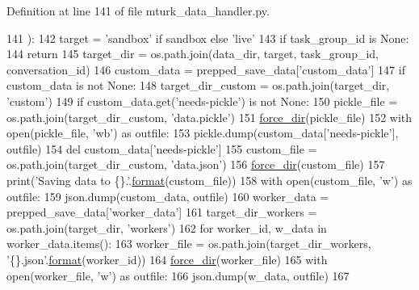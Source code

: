 Definition at line 141 of file mturk\+\_\+data\+\_\+handler.\+py.


\begin{DoxyCode}
141     ):
142         target = \textcolor{stringliteral}{'sandbox'} \textcolor{keywordflow}{if} sandbox \textcolor{keywordflow}{else} \textcolor{stringliteral}{'live'}
143         \textcolor{keywordflow}{if} task\_group\_id \textcolor{keywordflow}{is} \textcolor{keywordtype}{None}:
144             \textcolor{keywordflow}{return}
145         target\_dir = os.path.join(data\_dir, target, task\_group\_id, conversation\_id)
146         custom\_data = prepped\_save\_data[\textcolor{stringliteral}{'custom\_data'}]
147         \textcolor{keywordflow}{if} custom\_data \textcolor{keywordflow}{is} \textcolor{keywordflow}{not} \textcolor{keywordtype}{None}:
148             target\_dir\_custom = os.path.join(target\_dir, \textcolor{stringliteral}{'custom'})
149             \textcolor{keywordflow}{if} custom\_data.get(\textcolor{stringliteral}{'needs-pickle'}) \textcolor{keywordflow}{is} \textcolor{keywordflow}{not} \textcolor{keywordtype}{None}:
150                 pickle\_file = os.path.join(target\_dir\_custom, \textcolor{stringliteral}{'data.pickle'})
151                 \hyperlink{namespaceparlai_1_1mturk_1_1core_1_1mturk__data__handler_a28ec50366a486cded72d95c9be461c2f}{force\_dir}(pickle\_file)
152                 with open(pickle\_file, \textcolor{stringliteral}{'wb'}) \textcolor{keyword}{as} outfile:
153                     pickle.dump(custom\_data[\textcolor{stringliteral}{'needs-pickle'}], outfile)
154                 del custom\_data[\textcolor{stringliteral}{'needs-pickle'}]
155             custom\_file = os.path.join(target\_dir\_custom, \textcolor{stringliteral}{'data.json'})
156             \hyperlink{namespaceparlai_1_1mturk_1_1core_1_1mturk__data__handler_a28ec50366a486cded72d95c9be461c2f}{force\_dir}(custom\_file)
157             print(\textcolor{stringliteral}{'Saving data to \{\}.'}.\hyperlink{namespaceparlai_1_1chat__service_1_1services_1_1messenger_1_1shared__utils_a32e2e2022b824fbaf80c747160b52a76}{format}(custom\_file))
158             with open(custom\_file, \textcolor{stringliteral}{'w'}) \textcolor{keyword}{as} outfile:
159                 json.dump(custom\_data, outfile)
160         worker\_data = prepped\_save\_data[\textcolor{stringliteral}{'worker\_data'}]
161         target\_dir\_workers = os.path.join(target\_dir, \textcolor{stringliteral}{'workers'})
162         \textcolor{keywordflow}{for} worker\_id, w\_data \textcolor{keywordflow}{in} worker\_data.items():
163             worker\_file = os.path.join(target\_dir\_workers, \textcolor{stringliteral}{'\{\}.json'}.\hyperlink{namespaceparlai_1_1chat__service_1_1services_1_1messenger_1_1shared__utils_a32e2e2022b824fbaf80c747160b52a76}{format}(worker\_id))
164             \hyperlink{namespaceparlai_1_1mturk_1_1core_1_1mturk__data__handler_a28ec50366a486cded72d95c9be461c2f}{force\_dir}(worker\_file)
165             with open(worker\_file, \textcolor{stringliteral}{'w'}) \textcolor{keyword}{as} outfile:
166                 json.dump(w\_data, outfile)
167 
\end{DoxyCode}


